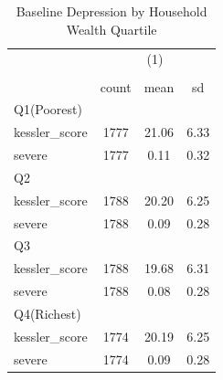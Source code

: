 \begin{table}[htbp]\centering
\def\sym#1{\ifmmode^{#1}\else\(^{#1}\)\fi}
\caption{Baseline Depression by Household Wealth Quartile}
\begin{tabular}{l*{1}{ccc}}
\toprule
            &\multicolumn{3}{c}{(1)}               \\
            &\multicolumn{3}{c}{}                  \\
            &       count&        mean&          sd\\
\midrule
Q1(Poorest) &            &            &            \\
kessler\_score&        1777&       21.06&        6.33\\
severe      &        1777&        0.11&        0.32\\
\midrule
Q2          &            &            &            \\
kessler\_score&        1788&       20.20&        6.25\\
severe      &        1788&        0.09&        0.28\\
\midrule
Q3          &            &            &            \\
kessler\_score&        1788&       19.68&        6.31\\
severe      &        1788&        0.08&        0.28\\
\midrule
Q4(Richest) &            &            &            \\
kessler\_score&        1774&       20.19&        6.25\\
severe      &        1774&        0.09&        0.28\\
\bottomrule
\end{tabular}
\end{table}
